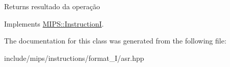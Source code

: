 \begin{DoxyReturn}{Returns}
resultado da operação 
\end{DoxyReturn}


Implements \hyperlink{classMIPS_1_1InstructionI_ae60fca5801bf5415cdff06d2aa11764f}{M\+I\+P\+S\+::\+InstructionI}.



The documentation for this class was generated from the following file\+:\begin{DoxyCompactItemize}
\item 
include/mips/instructions/format\+\_\+\+I/asr.\+hpp\end{DoxyCompactItemize}
